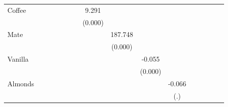 \begin{table}[htbp]
\begin{tabular}{l*{15}{c}}
Coffee    &                  &                  &                  &                  &                  &                  &    9.291\sym{***}&                  &                  &                  &                  &                  &                  &                  &                  \\
          &                  &                  &                  &                  &                  &                  &  (0.000)         &                  &                  &                  &                  &                  &                  &                  &                  \\
Mate      &                  &                  &                  &                  &                  &                  &                  &  187.748\sym{***}&                  &                  &                  &                  &                  &                  &                  \\
          &                  &                  &                  &                  &                  &                  &                  &  (0.000)         &                  &                  &                  &                  &                  &                  &                  \\
Vanilla   &                  &                  &                  &                  &                  &                  &                  &                  &   -0.055\sym{***}&                  &                  &                  &                  &                  &                  \\
          &                  &                  &                  &                  &                  &                  &                  &                  &  (0.000)         &                  &                  &                  &                  &                  &                  \\
Almonds   &                  &                  &                  &                  &                  &                  &                  &                  &                  &   -0.066         &                  &                  &                  &                  &                  \\
          &                  &                  &                  &                  &                  &                  &                  &                  &                  &      (.)         &                  &                  &                  &                  &                  \\

\end{tabular}
\end{table}
